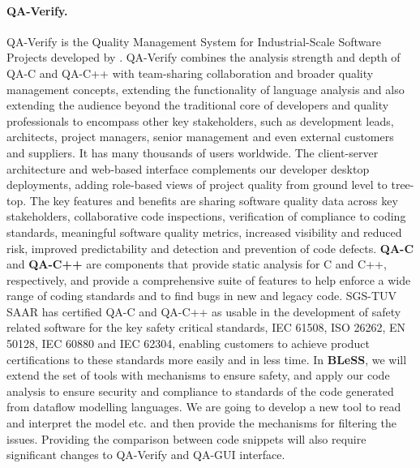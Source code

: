 \documentclass[a4paper,11pt]{article}
\newcommand{\project}[1]{\textbf{#1}\xspace}
\newcommand{\BLESS}{\project{BLeSS}}
\newcommand{\TheProject}{\BLESS}
\begin{document}
\paragraph{QA-Verify.} QA-Verify is the Quality Management System for Industrial-Scale Software Projects
developed by \PRshort. QA-Verify combines the analysis strength and depth of QA-C and QA-C++ with 
team-sharing collaboration and broader quality management concepts, extending the functionality of 
language analysis and also extending the audience beyond the traditional core of developers and 
quality professionals to encompass other key stakeholders, such as development leads, architects, 
project managers, senior management and even external customers and suppliers. It has many 
thousands of users worldwide. The client-server architecture and web-based interface complements 
our developer desktop deployments, adding role-based views of project quality from ground level 
to tree-top. The key features and benefits are sharing software quality data across key stakeholders,
collaborative code inspections, verification of compliance to coding standards, meaningful
software quality metrics, increased visibility and reduced risk, improved predictability and
detection and prevention of code defects. \textbf{QA-C} and \textbf{QA-C++} are components that
provide static analysis for C and C++, respectively, and provide a comprehensive suite of 
features to help enforce a wide range of coding standards and to find bugs in new and legacy
code. SGS-TUV SAAR has certified QA-C and QA-C++ as usable in the development of safety related 
software for the key safety critical standards, IEC 61508, ISO 26262, EN 50128, IEC 60880 and 
IEC 62304, enabling customers to achieve product certifications to these standards more easily 
and in less time. In \TheProject, we will extend the \PRshort set of tools with mechanisms
to ensure safety, and apply our code analysis to ensure security and compliance to standards
of the code generated from dataflow modelling languages. We are going to develop a new tool to read and interpret the model etc. and then provide the mechanisms for filtering the issues. Providing the comparison between code snippets will also require significant changes to QA-Verify and QA-GUI interface.
\end{document}
